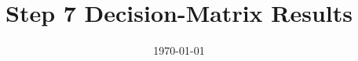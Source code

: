 \documentclass[11pt]{article}
\begin{document}
\title{Step 7 Decision-Matrix Results}
\author{}
\date{\today}
\maketitle


\end{document}
